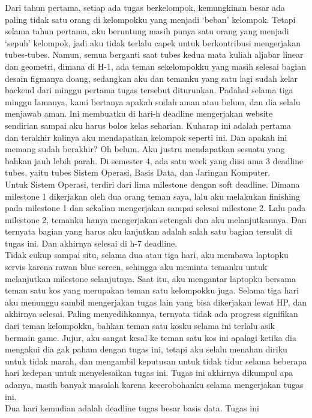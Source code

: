 \documentclass[
  letterpaper,
  DIV=11,
  numbers=noendperiod]{scrreprt}
\begin{document}
Dari tahun pertama, setiap ada tugas berkelompok, kemungkinan besar ada
paling tidak satu orang di kelompokku yang menjadi `beban' kelompok.
Tetapi selama tahun pertama, aku beruntung masih punya satu orang yang
menjadi `sepuh' kelompok, jadi aku tidak terlalu capek untuk
berkontribusi mengerjakan tubes-tubes. Namun, semua berganti saat tubes
kedua mata kuliah aljabar linear dan geometri, dimana di H-1, ada teman
sekelompokku yang masih selesai bagian desain figmanya doang, sedangkan
aku dan temanku yang satu lagi sudah kelar backend dari minggu pertama
tugas tersebut diturunkan. Padahal selama tiga minggu lamanya, kami
bertanya apakah sudah aman atau belum, dan dia selalu menjawab aman. Ini
membuatku di hari-h deadline mengerjakan website sendirian sampai aku
harus bolos kelas seharian. Kuharap ini adalah pertama dan terakhir
kalinya aku mendapatkan kelompok seperti ini. Dan apakah ini memang
sudah berakhir? Oh belum. Aku justru mendapatkan sesuatu yang bahkan
jauh lebih parah. Di semester 4, ada satu week yang diisi ama 3 deadline
tubes, yaitu tubes Sistem Operasi, Basis Data, dan Jaringan Komputer.\\
Untuk Sistem Operasi, terdiri dari lima milestone dengan soft deadline.
Dimana milestone 1 dikerjakan oleh dua orang teman saya, lalu aku
melakukan finishing pada milestone 1 dan sekalian mengerjakan sampai
selesai milestone 2. Lalu pada milestone 2, temanku hanya mengerjakan
setengah dan aku melanjutkannya. Dan ternyata bagian yang harus aku
lanjutkan adalah salah satu bagian tersulit di tugas ini. Dan akhirnya
selesai di h-7 deadline.\\
Tidak cukup sampai situ, selama dua atau tiga hari, aku membawa laptopku
servis karena rawan blue screen, sehingga aku meminta temanku untuk
melanjutkan milestone selanjutnya. Saat itu, aku mengantar laptopku
bersama teman satu kos yang merupakan teman satu kelompokku juga. Selama
tiga hari aku menunggu sambil mengerjakan tugas lain yang bisa
dikerjakan lewat HP, dan akhirnya selesai. Paling menyedihkannya,
ternyata tidak ada progress signifikan dari teman kelompokku, bahkan
teman satu kosku selama ini terlalu asik bermain game. Jujur, aku sangat
kesal ke teman satu kos ini apalagi ketika dia mengakui dia gak paham
dengan tugas ini, tetapi aku selalu menahan diriku untuk tidak marah,
dan mengambil keputusan untuk tidak tidur selama beberapa hari kedepan
untuk menyelesaikan tugas ini. Tugas ini akhirnya dikumpul apa adanya,
masih banyak masalah karena kecerobohanku selama mengerjakan tugas
ini.\\
Dua hari kemudian adalah deadline tugas besar basis data. Tugas ini
\end{document}
